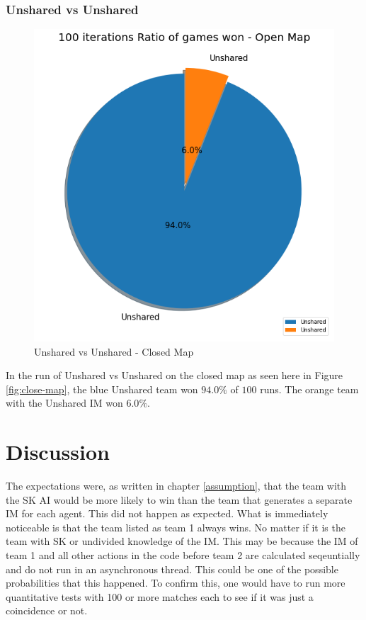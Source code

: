 \documentclass[]{report}
\begin{document}
		\subsection{Unshared vs Unshared}
		\begin{figure}[h!]
			\centering
			\includegraphics[width=0.9\linewidth]{"Images/100 Games Unshared vs Unshared Close Map"}
			\caption[Unshared vs Unshared - Closed Map]{Unshared vs Unshared - Closed Map}
			\label{fig:100-games-unshared-vs-unshared-close-map}
		\end{figure}
			In the run of Unshared vs Unshared on the closed map as seen here in Figure \ref{fig:close-map}, the blue Unshared team won $94.0\%$ of $100$ runs. The orange team with the Unshared \ac{IM} won $6.0\%$.
		
		
		\chapter{Discussion} \label{discussion}
		The expectations were, as written in chapter \ref{assumption}, that the team with the \ac{SK} \ac{AI} would be more likely to win than the team that generates a separate \ac{IM} for each agent. This did not happen as expected. What is immediately noticeable is that the team listed as team 1 always wins. No matter if it is the team with \ac{SK} or undivided knowledge of the \ac{IM}. This may be because the \ac{IM} of team 1 and all other actions in the code before team 2 are calculated seqeuntially and do not run in an asynchronous thread. This could be one of the possible probabilities that this happened. To confirm this, one would have to run more quantitative tests with 100 or more matches each to see if it was just a coincidence or not. 
		
\end{document}
